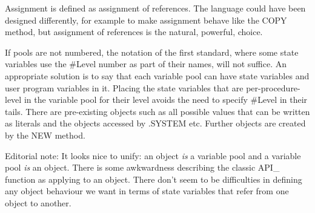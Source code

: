 Assignment is defined as assignment of references. The language could
have been designed differently, for example to make assignment behave
like the COPY method, but assignment of references is the natural,
powerful, choice.

If pools are not numbered, the notation of the first standard, where
some state variables use the \#Level number as part of their names, will
not suffice. An appropriate solution is to say that each variable pool
can have state variables and user program variables in it. Placing the
state variables that are per-procedure-level in the variable pool for
their level avoids the need to specify \#Level in their tails. There are
pre-existing objects such as all possible values that can be written as
literals and the objects accessed by .SYSTEM etc. Further objects are
created by the NEW method.

Editorial note: It looks nice to unify: an object \emph{is} a variable
pool and a variable pool \emph{is} an object. There is some awkwardness
describing the classic API\_ function as applying to an object. There
don't seem to be difficulties in defining any object behaviour we want
in terms of state variables that refer from one object to another.

